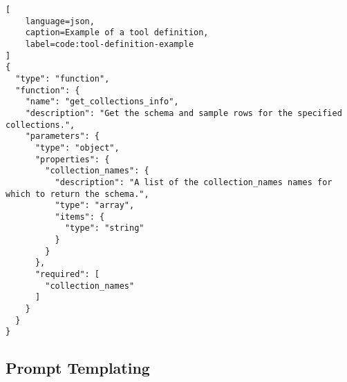 \begin{lstlisting}[
    language=json,
    caption=Example of a tool definition,
    label=code:tool-definition-example
]
{
  "type": "function",
  "function": {
    "name": "get_collections_info",
    "description": "Get the schema and sample rows for the specified collections.",
    "parameters": {
      "type": "object",
      "properties": {
        "collection_names": {
          "description": "A list of the collection_names names for which to return the schema.",
          "type": "array",
          "items": {
            "type": "string"
          }
        }
      },
      "required": [
        "collection_names"
      ]
    }
  }
}
\end{lstlisting}




\subsection{Prompt Templating}
\label{subsec:prompt-templating}






\glsresetall


